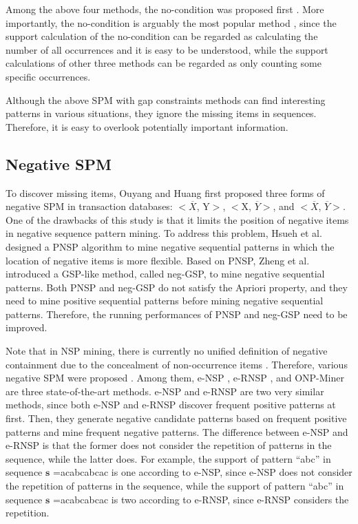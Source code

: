 Among the above four methods, the no-condition was proposed first \cite {33_Zhang2007}. More importantly, the no-condition is arguably the most popular method \cite{nocondition2021}, since the support calculation of the no-condition can be regarded as calculating the number of all occurrences and it is easy to be understood, while the support calculations of other three methods can be regarded as only counting some specific occurrences.



Although the above SPM with gap constraints methods can find interesting patterns in various situations, they ignore the missing items in sequences. Therefore, it is easy to overlook potentially important information.

\subsection{Negative SPM}
{To discover missing items, Ouyang and Huang \cite {ouyang2007} first proposed three forms of negative SPM in transaction databases: $<$$\overline {X}$, Y$>$, $<$X, $\overline {Y}$$>$, and $<$$\overline {X}$, $\overline {Y}$$>$. One of the drawbacks of this study is that it limits the position of negative items in negative sequence pattern mining. To address this problem, Hsueh et al. \cite{39_Hsueh2008} designed a PNSP algorithm to mine negative sequential patterns in which the location of negative items is more flexible. Based on PNSP, Zheng et al. \cite{40_Zheng2009} introduced a GSP-like method, called neg-GSP, to mine negative sequential patterns. Both PNSP and neg-GSP do not satisfy the Apriori property, and they need to mine positive sequential patterns before mining negative sequential patterns. Therefore, the running performances of PNSP and neg-GSP need to be improved.} 

Note that in NSP mining, there is currently no unified definition of negative containment due to the concealment of non-occurrence items \cite{dong2019}. Therefore, various negative SPM were proposed \cite {hannegative, 18_Wang2021}. Among them,  e-NSP \cite{41_Cao2016},  e-RNSP \cite{43_Dong2020}, and ONP-Miner \cite{onpminer} are three state-of-the-art methods. e-NSP \cite{41_Cao2016} and e-RNSP  \cite{43_Dong2020} are two very similar methods, since both e-NSP and e-RNSP discover frequent positive patterns at first. Then, they generate negative candidate patterns based on frequent positive patterns and mine frequent negative patterns. The difference between e-NSP and e-RNSP is that the former does not consider the repetition of patterns in the sequence, while the latter does.  For example, the support of pattern ``abc'' in sequence  $ \mathbf s $ =acabcabcac is one according to e-NSP, since e-NSP does not consider the repetition of patterns in the sequence, while the support of pattern ``abc''  in sequence  $ \mathbf s $ =acabcabcac is two according to e-RNSP, since e-RNSP considers the repetition. 

